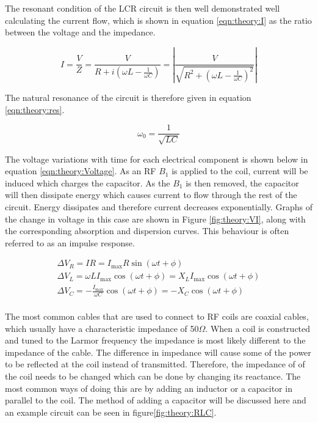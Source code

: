 The resonant condition of the LCR circuit is then well demonstrated well calculating the current flow, which is shown in equation \ref{eqn:theory:I} as the ratio between the voltage and the impedance.

\begin{equation}
    I = \frac{V}{Z} = \frac{V}{R+i(\omega L - \frac{1}{\omega C})} = \left| \frac{V}{\sqrt{R^2+(\omega L - \frac{1}{\omega C})^2}} \right|
    \label{eqn:theory:I}
\end{equation}

The natural resonance of the circuit is therefore given in equation \ref{eqn:theory:res}.

\begin{equation}
    \omega_0 = \frac{1}{\sqrt{LC}}
    \label{eqn:theory:res}
\end{equation}

The voltage variations with time for each electrical component is shown below in equation \ref{eqn:theory:Voltage}. As an \ac{RF} $B_1$ is applied to the coil, current will be induced which charges the capacitor. As the $B_1$ is then removed, the capacitor will then dissipate energy which causes current to flow through the rest of the circuit. Energy dissipates and therefore current decreases exponentially. Graphs of the change in voltage in this case are shown in Figure \ref{fig:theory:VI}, along with the corresponding absorption and dispersion curves. This behaviour is often referred to as an impulse response.

\begin{equation}
\begin{gathered}
    \Delta V_R = IR = I_{\mathrm{max}}R\sin(\omega t + \phi) \\
    \Delta V_L = \omega LI_{\mathrm{max}}\cos(\omega t + \phi) =  X_LI_{\mathrm{max}}\cos(\omega t + \phi)\\
    \Delta V_C = -\frac{I_{\mathrm{max}}}{\omega C}\cos(\omega t + \phi) = -X_C\cos(\omega t + \phi)\\
    \label{eqn:theory:Voltage}
\end{gathered}
\end{equation}

The most common cables that are used to connect to \ac{RF} coils are coaxial cables, which usually have a characteristic impedance of 50$\Omega$. When a coil is constructed and tuned to the Larmor frequency the impedance is most likely different to the impedance of the cable. The difference in impedance will cause some of the power to be reflected at the coil instead of transmitted. Therefore, the impedance of of the coil needs to be changed which can be done by changing its reactance. The most common ways of doing this are by adding an inductor or a capacitor in parallel to the coil. The method of adding a capacitor will be discussed here and an example circuit can be seen in figure\ref{fig:theory:RLC}.

